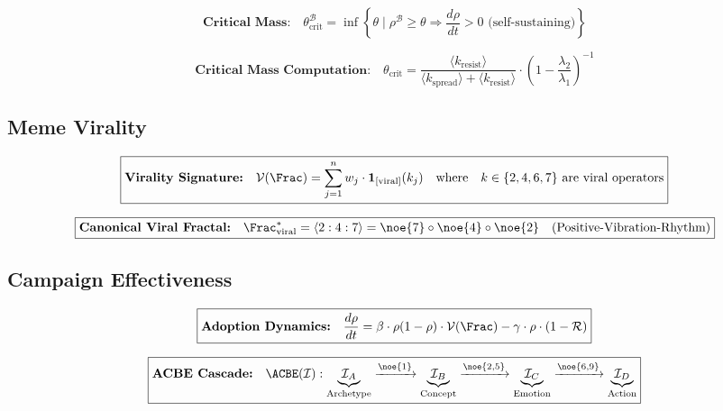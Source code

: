 \begin{equation}
\boxed{
    \textbf{Critical Mass:} \quad
    \theta_{\mathrm{crit}}^{\mathcal{B}} = \inf \left\{ \theta \;\Big|\;
    \rho^{\mathcal{B}} \geq \theta \Rightarrow \frac{d\rho}{dt} > 0
    \text{ (self-sustaining)} \right\}
}
\label{eq:critical-mass}
\end{equation}

\begin{equation}
\boxed{
    \textbf{Critical Mass Computation:} \quad
    \theta_{\mathrm{crit}} =
    \frac{\langle k_{\mathrm{resist}} \rangle}
    {\langle k_{\mathrm{spread}} \rangle + \langle k_{\mathrm{resist}} \rangle}
    \cdot \left(1 - \frac{\lambda_2}{\lambda_1}\right)^{-1}
}
\label{eq:critical-mass-compute}
\end{equation}

\subsection{Meme Virality}

\begin{equation}
\boxed{
    \textbf{Virality Signature:} \quad
    \mathcal{V}(\Frac) = \sum_{j=1}^{n} w_j \cdot \mathbf{1}_{[\text{viral}]}(k_j)
    \quad \text{where} \quad
    k \in \{2, 4, 6, 7\} \text{ are viral operators}
}
\label{eq:virality}
\end{equation}

\begin{equation}
\boxed{
    \textbf{Canonical Viral Fractal:} \quad
    \Frac_{\mathrm{viral}}^* = \langle 2:4:7 \rangle
    = \noe{7} \circ \noe{4} \circ \noe{2}
    \quad \text{(Positive-Vibration-Rhythm)}
}
\label{eq:viral-fractal}
\end{equation}

\subsection{Campaign Effectiveness}

\begin{equation}
\boxed{
    \textbf{Adoption Dynamics:} \quad
    \frac{d\rho}{dt} = \beta \cdot \rho(1 - \rho) \cdot \mathcal{V}(\Frac)
    - \gamma \cdot \rho \cdot (1 - \mathcal{R})
}
\label{eq:adoption-dynamics}
\end{equation}

\begin{equation}
\boxed{
    \textbf{ACBE Cascade:} \quad
    \ACBE(\mathcal{I}) : \underbrace{\mathcal{I}_A}_{\text{Archetype}}
    \xrightarrow{\noe{1}} \underbrace{\mathcal{I}_B}_{\text{Concept}}
    \xrightarrow{\noe{2,5}} \underbrace{\mathcal{I}_C}_{\text{Emotion}}
    \xrightarrow{\noe{6,9}} \underbrace{\mathcal{I}_D}_{\text{Action}}
}
\label{eq:acbe-cascade}
\end{equation}

